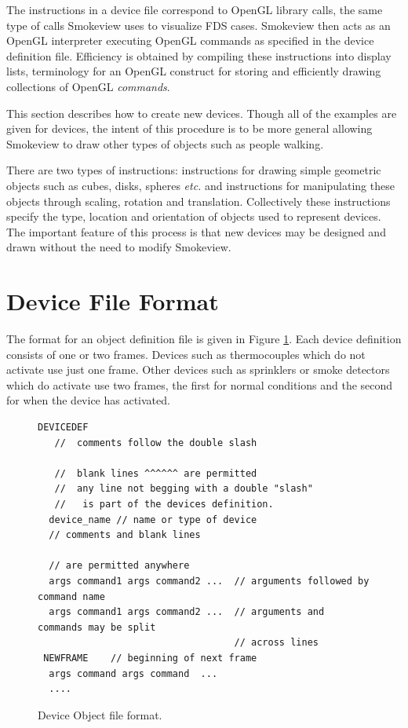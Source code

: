 \documentclass[11pt,twoside]{book}
\newcommand{\figoptions}{hbp}
\begin{document}
The instructions in a device file correspond to OpenGL library calls,
the same type of calls Smokeview uses to visualize FDS cases.
Smokeview then acts as an OpenGL interpreter executing OpenGL
commands as specified in the device definition file. Efficiency is
obtained by compiling these instructions into display lists,
terminology for an OpenGL construct for storing and efficiently
drawing collections of OpenGL {\em commands}.

This section describes how to create new devices. Though all of
the examples are given for devices, the intent of this procedure
is to be more general allowing Smokeview to draw other types of
objects such as people walking.

There are two types of instructions: instructions for drawing
simple geometric objects such as cubes, disks, spheres {\em etc.}
and instructions for manipulating these objects through scaling,
rotation and translation. Collectively these instructions specify
the type, location and orientation of objects used to represent
devices.  The important feature of this process is that new
devices may be designed and drawn without the need to modify
Smokeview.

\section{Device File Format}
The format for an object definition file is given in Figure
\ref{figobjectdef}.  Each device definition consists of one or two
frames.  Devices such as thermocouples which do not activate use
just one frame. Other devices such as sprinklers or smoke
detectors which do activate use two frames, the first for normal
conditions and the second for when the device has activated.

\begin{figure}[\figoptions]
{\small
\begin{Verbatim}[frame=single,rulecolor=\color{blue},
framerule=3pt,framesep=1pc,fillcolor=\color{yellow}]
DEVICEDEF
   //  comments follow the double slash

   //  blank lines ^^^^^^ are permitted
   //  any line not begging with a double "slash"
   //   is part of the devices definition.
  device_name // name or type of device
  // comments and blank lines

  // are permitted anywhere
  args command1 args command2 ...  // arguments followed by command name
  args command1 args command2 ...  // arguments and commands may be split
                                   // across lines
 NEWFRAME    // beginning of next frame
  args command args command  ...
  ....
\end{Verbatim}
} \caption{Device Object file format.}
\label{figobjectdef}%
\end{figure}
\end{document}
